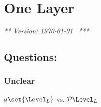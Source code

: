\chapter{One Layer}
\label{chap:singleLayer}

\renewcommand{\present}{\ensuremath{\mathit{present}}}
\renewcommand{\interpret}{\ensuremath{\mathit{interpret}}}
\newcommand{\spc}{\textvisiblespace}


\renewcommand{\H}{_{\, \mathrm H}}  %
\renewcommand{\L}{_{\, \mathrm L}} %



{\em *** Version: \today~ ***}


\section{Questions:}

\subsection{Unclear}

\bl
\o $\set{\Level_L}$ vs. $\mathcal{P}\Level_L$
\el

%
%
%
%




